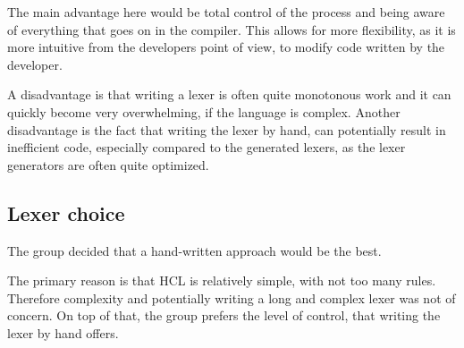 The main advantage here would be total control of the process and being aware of everything that goes on in the compiler. 
This allows for more flexibility, as it is more intuitive from the developers point of view, to modify code written by the developer.

A disadvantage is that writing a lexer is often quite monotonous work and it can quickly become very overwhelming, if the language is complex.
Another disadvantage is the fact that writing the lexer by hand, can potentially result in inefficient code, especially compared to the generated lexers, as the lexer generators are often quite optimized.

\subsection{Lexer choice}
\label{LexerChoice}
The group decided that a hand-written approach would be the best.

The primary reason is that HCL is relatively simple, with not too many rules.
Therefore complexity and potentially writing a long and complex lexer was not of concern.
On top of that, the group prefers the level of control, that writing the lexer by hand offers.
